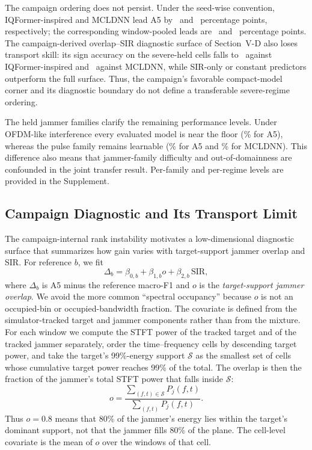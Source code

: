 \documentclass[letterpaper,journal]{IEEEtran}
\newcommand{\pp}{percentage points}
\begin{document}
The campaign ordering does not persist. Under the seed-wise convention,
IQFormer-inspired and MCLDNN lead A5 by \SevereReferenceLeadIqformer\ and
\SevereReferenceLeadMcldnn\ \pp, respectively; the corresponding
window-pooled leads are \SevereTransferLeadIqformer\ and
\SevereTransferLeadMcldnn\ \pp. The campaign-derived overlap--SIR diagnostic
surface of Section~V-D also loses transport skill: its sign accuracy on the
severe-held cells falls to \SevereTransferSignAccIqformer\ against
IQFormer-inspired and \SevereTransferSignAccMcldnn\ against MCLDNN, while
SIR-only or constant predictors outperform the full surface. Thus, the
campaign's favorable compact-model corner and its
diagnostic boundary do not define a transferable severe-regime ordering.

The held jammer families clarify the remaining performance levels. Under
OFDM-like interference every evaluated model is near the floor
(\SevereHeldFamilyOfdmAFive\% for A5), whereas the pulse family remains
learnable (\SevereHeldFamilyPulseAFive\% for A5 and
\SevereHeldFamilyPulseMcldnn\% for MCLDNN). This difference also means that
jammer-family difficulty and out-of-domainness are confounded in the joint
transfer result. Per-family and per-regime levels are provided in the
Supplement.

\subsection{Campaign Diagnostic and Its Transport Limit}
The campaign-internal rank instability motivates a low-dimensional diagnostic
surface that summarizes how gain varies with target-support jammer overlap and
SIR. For reference $b$, we fit
\begin{equation}
\Delta_b=\beta_{0,b}+\beta_{1,b}o+\beta_{2,b}\,\mathrm{SIR},
\label{eq:envelope}
\end{equation}
where $\Delta_b$ is A5 minus the reference macro-F1 and $o$ is the
\emph{target-support jammer overlap}. We avoid the more common ``spectral
occupancy'' because $o$ is not an occupied-bin or occupied-bandwidth fraction.
The covariate is defined from the simulator-tracked target and jammer
components rather than from the mixture. For each window we compute the STFT
power of the tracked target and of the tracked jammer separately, order the
time--frequency cells by descending target power, and take the target's
99\%-energy support $\mathcal{S}$ as the smallest set of cells whose cumulative
target power reaches 99\% of the total. The overlap is then the fraction of the
jammer's total STFT power that falls inside $\mathcal{S}$:
\begin{equation}
o=\frac{\sum_{(f,t)\in\mathcal{S}}P_j(f,t)}{\sum_{(f,t)}P_j(f,t)}.
\label{eq:overlap}
\end{equation}
Thus $o=0.8$ means that 80\% of the jammer's energy lies within the target's
dominant support, not that the jammer fills 80\% of the plane. The cell-level
covariate is the mean of $o$ over the windows of that cell.
\end{document}
